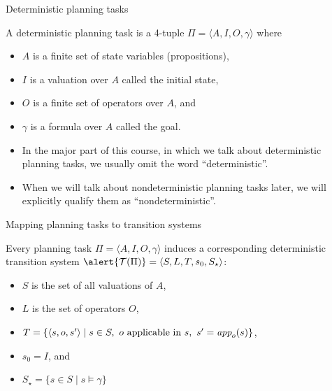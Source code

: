 \documentclass{gkibeamer}
\begin{document}
\begin{frame}{Deterministic planning tasks}
  \begin{definition}
    A \alert{deterministic planning task} is a 4-tuple $\Pi = \langle
    A,I,O, \gamma\rangle$ where
    \begin{itemize}
    \item $A$ is a finite set of \alert{state variables}
      (propositions),
    \item $I$ is a valuation over $A$ called the \alert{initial state},
    \item $O$ is a finite set of \alert{operators} over $A$, and
    \item $\gamma$ is a formula over $A$ called the \alert{goal}.
    \end{itemize}
  \end{definition}

  \begin{itemize}
  \item In the major part of this course, in which we talk about
    deterministic planning tasks, we usually omit the word
    ``deterministic''.
  \item When we will talk about nondeterministic planning tasks later,
    we will explicitly qualify them as ``nondeterministic''.
  \end{itemize}
\end{frame}

\begin{frame}{Mapping planning tasks to transition systems}
  \begin{definition}
    Every planning task $\Pi = \langle A,I,O,\gamma\rangle$ induces a
    corresponding deterministic transition system $\alert{\mathcal T(\Pi)} =
    \langle S, L, T, s_0, S_\star\rangle$:
    \begin{itemize}
    \item $S$ is the set of all valuations of $A$,
    \item $L$ is the set of operators $O$,
    \item $T = \{ \langle s, o, s'\rangle \mid
      s \in S,~ o \text{~applicable in~}s,~ s' = \textit{app}_{o}(s)\}$,
    \item $s_0 = I$, and
    \item $S_\star = \{ s \in S \mid s \models \gamma\}$
    \end{itemize}
  \end{definition}
\end{frame}
\end{document}

